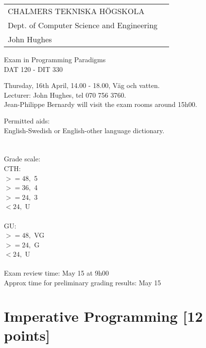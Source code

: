\documentclass{article}
\begin{document}
\newcommand{\examdate}{Thursday, 16th April}
\newcommand{\examtime}{14.00 - 18.00}

\noindent
\begin{tabular}{lr}
CHALMERS TEKNISKA H\"OGSKOLA              \\
Dept. of Computer Science and Engineering \\
John Hughes                               \\
\end{tabular}

\vspace{2.5cm} \noindent
\begin{center} {\LARGE
Exam in Programming Paradigms} \\
DAT 120 - DIT 330
\end{center}

\vspace{1.5cm}

\noindent
\examdate, \examtime, V\"ag och vatten.\\
Lecturer: John Hughes, tel 070 756 3760.\\
Jean-Philippe Bernardy will visit the exam rooms around 15h00.
\vspace{1cm}

\noindent
Permitted aids:\\
English-Swedish or English-other language dictionary.\\
\\
\\
Grade scale:\\
CTH: \\
$>= 48,$ 5\\
$>= 36,$ 4\\
$>= 24,$ 3\\
$< 24, $ U\\
\\
GU:\\
$>= 48,$ VG\\
$>= 24,$ G\\
$< 24, $ U\\
\\
Exam review time: May 15 at 9h00\\
Approx time for preliminary grading results: May 15


\newcommand{\comment}[1]{\marginpar{#1}}

\newpage
\section{Imperative Programming {\textbf{[12 points]}}}
\end{document}
